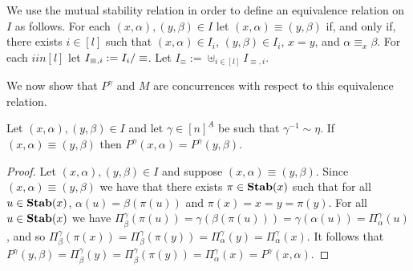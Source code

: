 \documentclass[../main/thesis.tex]{subfiles}
\begin{document}
We use the mutual stability relation in order to define an equivalence relation
on $I$ as follows. For each $(x, \alpha), (y, \beta) \in I$ let $(x, \alpha)
\equiv (y, \beta)$ if, and only if, there exists $i \in [l]$ such that $(x,
\alpha) \in I_i$, $(y, \beta) \in I_i$, $x = y$, and $\alpha \equiv_x \beta$.
For each $i in [l]$ let $I_{\equiv, i} := I_i / \equiv$. Let $I_{\equiv}
:= \uplus_{i \in [l]}I_{\equiv, i}$.

We now show that $P^{\gamma}$ and $M$ are concurrences with respect to this
equivalence relation.

\begin{lem}
  Let $(x, \alpha), (y, \beta) \in I$ and let $\gamma \in [n]^{\underline{A}}$
  be such that $\gamma^{-1} \sim \eta$. If $(x, \alpha) \equiv (y, \beta)$ then
  $P^{\gamma}(x, \alpha) = P^{\gamma}(y, \beta)$.
	\label{lem:quot-well-defined}
\end{lem}
\begin{proof}
  Let $(x, \alpha), (y, \beta) \in I$ and suppose $(x, \alpha) \equiv (y,
  \beta)$. Since $(x, \alpha) \equiv (y, \beta)$ we have that there exists $\pi
  \in \text{\textbf{Stab}}(x)$ such that for all $u \in \text{\textbf{Stab}}(x)$, $\alpha (u) = \beta (\pi
  (u))$ and $\pi (x) = x = y = \pi (y)$. For all $u \in \text{\textbf{Stab}}(x)$ we have
  $\Pi^{\gamma}_{\beta} (\pi (u)) = \gamma (\beta (\pi (u))) = \gamma (\alpha
  (u)) = \Pi^{\gamma}_{\alpha}(u)$, and so $\Pi^{\gamma}_{\beta}(\pi (x)) =
  \Pi^{\gamma}_{\beta}(\pi (y)) = \Pi^{\gamma}_{\alpha}(y) =
  \Pi^{\gamma}_{\alpha}(x)$. It follows that $P^{\gamma}(y, \beta) =
  \Pi^{\gamma}_{\beta} (y) = \Pi^{\gamma}_{\beta} (\pi (y)) =
  \Pi^{\gamma}_{\alpha}(x) = P^{\gamma}(x, \alpha)$.
\end{proof}
\end{document}
